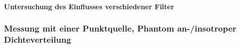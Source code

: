           \minipend\\ \ \\
            \textbf{Untersuchung des Einflusses verschiedener Filter}\\
            
            
        \subsubsection{Messung mit einer Punktquelle, Phantom an-/insotroper Dichteverteilung}